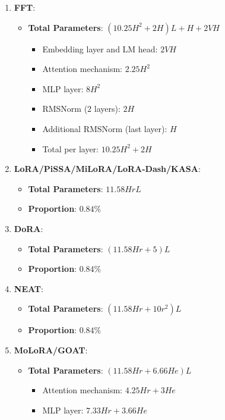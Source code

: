 \begin{enumerate}
    \item \textbf{FFT}:
    \begin{itemize}
        \item \textbf{Total Parameters}: \( (10.25H^2 + 2H)L + H + 2VH \)
        \begin{itemize}
            \item Embedding layer and LM head: \( 2VH \)
            \item Attention mechanism: \( 2.25H^2 \)
            \item MLP layer: \( 8H^2 \)
            \item RMSNorm (2 layers): \( 2H \)
            \item Additional RMSNorm (last layer): \( H \)
            \item Total per layer: \( 10.25H^2 + 2H \)
        \end{itemize}
    \end{itemize}
    \item \textbf{LoRA/PiSSA/MiLoRA/LoRA-Dash/KASA}:
    \begin{itemize}
        \item \textbf{Total Parameters}: \( 11.58HrL \)
        \item \textbf{Proportion}: \( 0.84\% \)
    \end{itemize}
    \item \textbf{DoRA}:
    \begin{itemize}
        \item \textbf{Total Parameters}: \( (11.58Hr + 5)L \)
        \item \textbf{Proportion}: \( 0.84\% \)
    \end{itemize}
    \item \textbf{NEAT}:
    \begin{itemize}
        \item \textbf{Total Parameters}: \( (11.58Hr + 10r^2)L \)
        \item \textbf{Proportion}: \( 0.84\% \)
    \end{itemize}
    \item \textbf{MoLoRA/GOAT}:
    \begin{itemize}
        \item \textbf{Total Parameters}: \( (11.58Hr + 6.66He)L \)
        \begin{itemize}
            \item Attention mechanism: \( 4.25Hr+3He \)
            \item MLP layer: \( 7.33Hr+3.66He \)

\end{itemize}
\end{itemize}
\end{enumerate}
